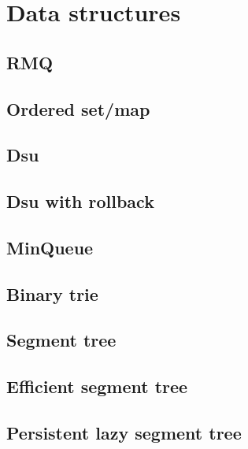 \section{Data structures}

\subsection{RMQ}

\subsection{Ordered set/map}

\subsection{Dsu}

\subsection{Dsu with rollback}

\subsection{MinQueue}

\subsection{Binary trie}

\subsection{Segment tree}

\subsection{Efficient segment tree}

\subsection{Persistent lazy segment tree}

